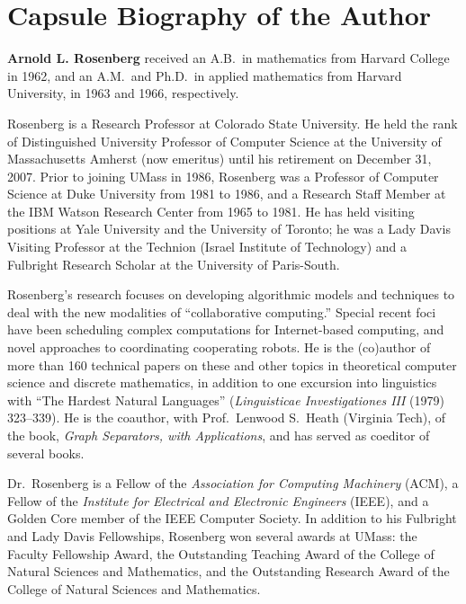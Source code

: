 

\chapter*{Capsule Biography of the Author}


\begin{figure}[htb]
\centerline{}
\end{figure}

\noindent
{\bf Arnold L. Rosenberg} received an A.B.~in mathematics from Harvard
College in 1962, and an A.M.~and Ph.D.~in applied mathematics from
Harvard University, in 1963 and 1966, respectively.

Rosenberg is a Research Professor at Colorado State University.  He
held the rank of Distinguished University Professor of Computer
Science at the University of Massachusetts Amherst (now emeritus)
until his retirement on December 31, 2007.  Prior to joining UMass in
1986, Rosenberg was a Professor of Computer Science at Duke University
from 1981 to 1986, and a Research Staff Member at the IBM Watson
Research Center from 1965 to 1981.  He has held visiting positions at
Yale University and the University of Toronto; he was a Lady Davis
Visiting Professor at the Technion (Israel Institute of Technology)
and a Fulbright Research Scholar at the University of Paris-South.

Rosenberg's research focuses on developing algorithmic models and
techniques to deal with the new modalities of ``collaborative
computing.''  Special recent foci have been scheduling complex
computations for Internet-based computing, and novel approaches to
coordinating cooperating robots.  He is the (co)author of more than
160 technical papers on these and other topics in theoretical computer
science and discrete mathematics, in addition to one excursion into
linguistics with ``The Hardest Natural Languages'' ({\it Linguisticae
Investigationes III} (1979) 323--339).  He is the coauthor, with
Prof.~Lenwood S.~Heath (Virginia Tech), of the book, {\it Graph
Separators, with Applications}, and has served as coeditor of several
books.

Dr.~Rosenberg is a Fellow of the {\em Association for Computing
  Machinery} (ACM), a Fellow of the {\em Institute for Electrical and
  Electronic Engineers} (IEEE), and a Golden Core member of the IEEE
Computer Society.  In addition to his Fulbright and Lady Davis
Fellowships, Rosenberg won several awards at UMass: the Faculty
Fellowship Award, the Outstanding Teaching Award of the College of
Natural Sciences and Mathematics, and the Outstanding Research Award
of the College of Natural Sciences and Mathematics.

